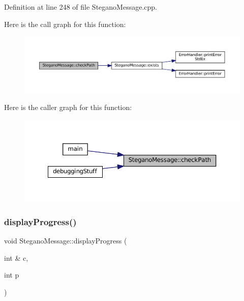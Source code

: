 Definition at line 248 of file Stegano\+Message.\+cpp.

Here is the call graph for this function\+:
\nopagebreak
\begin{figure}[H]
\begin{center}
\leavevmode
\includegraphics[width=350pt]{classSteganoMessage_a9d87adef1584cc184ccd4b5d86fba744_cgraph}
\end{center}
\end{figure}
Here is the caller graph for this function\+:
\nopagebreak
\begin{figure}[H]
\begin{center}
\leavevmode
\includegraphics[width=350pt]{classSteganoMessage_a9d87adef1584cc184ccd4b5d86fba744_icgraph}
\end{center}
\end{figure}
\mbox{\label{classSteganoMessage_a50936bb2352eaaa1112280c2ac3ca2d5}} 
\subsubsection{\texorpdfstring{displayProgress()}{displayProgress()}\hspace{0.1cm}{\footnotesize\ttfamily [1/2]}}
{\footnotesize\ttfamily void Stegano\+Message\+::display\+Progress (\begin{DoxyParamCaption}\item[{int \&}]{c,  }\item[{int}]{p }\end{DoxyParamCaption})\hspace{0.3cm}{\ttfamily [private]}}



